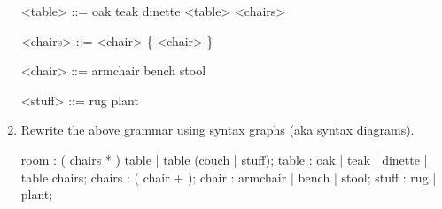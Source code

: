 \documentclass[12pt,letterpaper]{article}
\begin{document}
\begin{enumerate}
\begin{grammar}
        <table> ::= oak
                \alt teak
                \alt dinette
                \alt <table> <chairs>

        <chairs> ::= <chair> \{ <chair> \}

        <chair> ::= armchair
                \alt bench
                \alt stool

        <stuff> ::= rug
                \alt plant
      \end{grammar}

    \item Rewrite the above grammar using syntax graphs (aka syntax diagrams).
      \begin{rail}
        room : ( chairs * ) table | table (couch | stuff);
        table : oak | teak | dinette | table chairs;
        chairs : ( chair + );
        chair : armchair | bench | stool;
        stuff : rug | plant;
      \end{rail}
  \end{enumerate}
\end{document}
